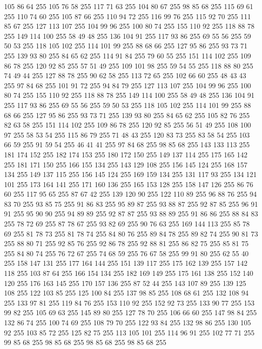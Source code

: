 105 86 64 255 105 76 58 255 117 71 63 255 104 80 67 255 98 85 68 255 115 69 61 255 110 74 60 255 105 87 66 255 110 94 72 255 116 99 76 255 115 92 70 255 111 85 67 255 127 113 107 255 104 99 96 255 100 80 74 255 155 110 92 255 118 88 78 255 149 114 100 255 58 49 48 255 136 104 91 255 117 93 86 255 69 55 56 255 59 50 53 255 118 105 102 255 114 101 99 255 88 68 66 255 127 95 86 255 93 73 71 255 139 93 80 255 84 65 62 255 114 91 84 255 79 60 55 255 151 114 102 255 109 86 78 255 120 92 85 255 57 51 49 255 109 101 98 255 59 54 55 255 118 88 80 255 74 49 44 255 127 88 78 255 90 62 58 255 113 72 65 255 102 66 60 255 48 43 43 255 97 84 68 255 101 91 72 255 94 84 79 255 127 113 107 255 104 99 96 255 100 80 74 255 155 110 92 255 118 88 78 255 149 114 100 255 58 49 48 255 136 104 91 255 117 93 86 255 69 55 56 255 59 50 53 255 118 105 102 255 114 101 99 255 88 68 66 255 127 95 86 255 93 73 71 255
139 93 80 255 84 65 62 255 105 82 76 255 82 63 58 255 151 114 102 255 109 86 78 255 120 92 85 255 56 51 49 255 108 100 97 255 58 53 54 255 115 86 79 255 71 48 43 255 120 83 73 255 83 58 54 255 103 66 59 255 91 59 54 255 46 41 41 255 97 84 68 255 98 85 68 255 143 133 113 255 181 174 152 255 182 174 153 255 180 172 150 255 149 137 114 255 175 165 142 255 181 171 150 255 166 155 134 255 143 129 108 255 156 145 124 255 168 157 134 255 149 137 115 255 156 145 124 255 169 159 134 255 131 117 93 255 134 121 101 255 173 164 141 255 171 160 136 255 165 153 128 255 158 147 126 255 86 76 60 255 117 95 65 255 87 67 42 255 139 120 90 255 122 110 89 255 96 88 76 255 94 83 70 255 93 85 75 255 91 86 83 255 95 89 87 255 93 88 87 255 92 87 85 255 96 91 91 255 95 90 90 255 94 89 89 255 92 87 87 255 93 88 89 255 91 86 86 255 88 84 83 255 78 72 69 255 87 78 67 255 93 82 69 255 90 76 63 255 169 144 113 255 85 78 69 255
81 78 73 255 81 78 74 255 84 80 76 255 89 84 78 255 89 82 74 255 90 81 73 255 88 80 71 255 92 85 76 255 92 86 78 255 92 88 81 255 86 82 75 255 85 81 75 255 84 80 74 255 76 72 67 255 74 68 59 255 76 67 58 255 99 91 80 255 62 55 40 255 158 147 131 255 177 164 144 255 151 139 117 255 175 162 139 255 157 142 118 255 103 87 64 255 166 154 134 255 182 169 149 255 175 161 138 255 152 140 120 255 176 163 145 255 170 157 136 255 87 52 44 255 143 107 89 255 139 125 108 255 122 103 85 255 125 100 84 255 137 98 85 255 108 68 61 255 132 108 94 255 133 97 81 255 119 84 76 255 153 110 92 255 152 92 73 255 133 90 77 255 153 99 82 255 105 69 63 255 145 89 80 255 127 78 70 255 106 66 60 255 147 98 84 255 132 86 74 255 100 74 69 255 108 79 70 255 122 93 84 255 132 98 86 255 130 105 92 255 103 85 72 255 125 82 75 255 113 105 101 255 114 96 91 255 102 77 71 255 99 85 68 255 98 85 68 255 98 85 68 255 98 85 68 255

